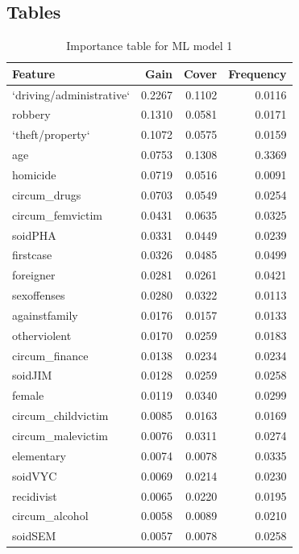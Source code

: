 \documentclass[12pt, twoside,openany]{book} %
\begin{document}
\begin{appendices}
\chapter{Tables}
\begin{table}[ht]
\centering
\begin{tabular}{lrrr}
  \hline
  Feature & Gain & Cover & Frequency \\ 
  \hline
 `driving/administrative` & 0.2267 & 0.1102 & 0.0116 \\ 
   robbery & 0.1310 & 0.0581 & 0.0171 \\ 
   `theft/property` & 0.1072 & 0.0575 & 0.0159 \\ 
   age & 0.0753 & 0.1308 & 0.3369 \\ 
   homicide & 0.0719 & 0.0516 & 0.0091 \\ 
   circum\_drugs & 0.0703 & 0.0549 & 0.0254 \\ 
   circum\_femvictim & 0.0431 & 0.0635 & 0.0325 \\ 
   soidPHA & 0.0331 & 0.0449 & 0.0239 \\ 
   firstcase & 0.0326 & 0.0485 & 0.0499 \\ 
   foreigner & 0.0281 & 0.0261 & 0.0421 \\ 
   sexoffenses & 0.0280 & 0.0322 & 0.0113 \\ 
   againstfamily & 0.0176 & 0.0157 & 0.0133 \\ 
   otherviolent & 0.0170 & 0.0259 & 0.0183 \\ 
   circum\_finance & 0.0138 & 0.0234 & 0.0234 \\ 
   soidJIM & 0.0128 & 0.0259 & 0.0258 \\ 
   female & 0.0119 & 0.0340 & 0.0299 \\ 
   circum\_childvictim & 0.0085 & 0.0163 & 0.0169 \\ 
   circum\_malevictim & 0.0076 & 0.0311 & 0.0274 \\ 
   elementary & 0.0074 & 0.0078 & 0.0335 \\ 
   soidVYC & 0.0069 & 0.0214 & 0.0230 \\ 
   recidivist & 0.0065 & 0.0220 & 0.0195 \\ 
   circum\_alcohol & 0.0058 & 0.0089 & 0.0210 \\ 
   soidSEM & 0.0057 & 0.0078 & 0.0258 \\ 
     \hline
\end{tabular}

 \caption{Importance table for ML model 1}
\medskip
{\small {}}
\end{table}







\end{appendices}
\end{document}
